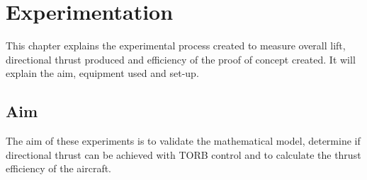 \chapter{Experimentation}
\label{sec: Experiment}
    This chapter explains the experimental process created to measure overall lift, directional thrust produced and efficiency of the proof of concept created. It will explain the aim, equipment used and set-up.
    \section{Aim}
        The aim of these experiments is to validate the mathematical model, determine if directional thrust can be achieved with TORB control and to calculate the thrust efficiency of the aircraft.
